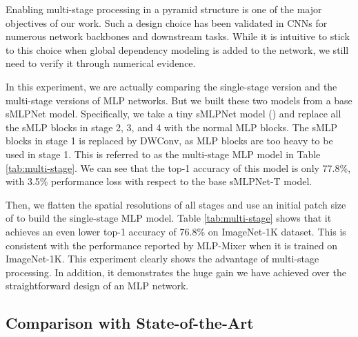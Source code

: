 \documentclass[letterpaper]{article} \usepackage{aaai22}  \usepackage{times}  \usepackage{helvet}  \usepackage{courier}  \usepackage[hyphens]{url}  \usepackage{graphicx} \usepackage{color}
\begin{document}
Enabling multi-stage processing in a pyramid structure is one of the major objectives of our work. Such a design choice has been validated in CNNs for numerous network backbones and downstream tasks. While it is intuitive to stick to this choice when global dependency modeling is added to the network, we still need to verify it through numerical evidence. 

In this experiment, we are actually comparing the single-stage version and the multi-stage versions of MLP networks. But we built these two models from a base sMLPNet model. Specifically, we take a tiny sMLPNet model () and replace all the sMLP blocks in stage 2, 3, and 4 with the normal MLP blocks. The sMLP blocks in stage 1 is replaced by DWConv, as MLP blocks are too heavy to be used in stage 1. This is referred to as the multi-stage MLP model in Table \ref{tab:multi-stage}. We can see that the top-1 accuracy of this model is only 77.8\%, with 3.5\% performance loss with respect to the base sMLPNet-T model. 

Then, we flatten the spatial resolutions of all stages and use an initial patch size of  to build the single-stage MLP model. Table \ref{tab:multi-stage} shows that it achieves an even lower top-1 accuracy of 76.8\% on ImageNet-1K dataset. This is consistent with the performance reported by MLP-Mixer when it is trained on ImageNet-1K. This experiment clearly shows the advantage of multi-stage processing. In addition, it demonstrates the huge gain we have achieved over the straightforward design of an MLP network. 


\subsection{Comparison with State-of-the-Art}
\end{document}
